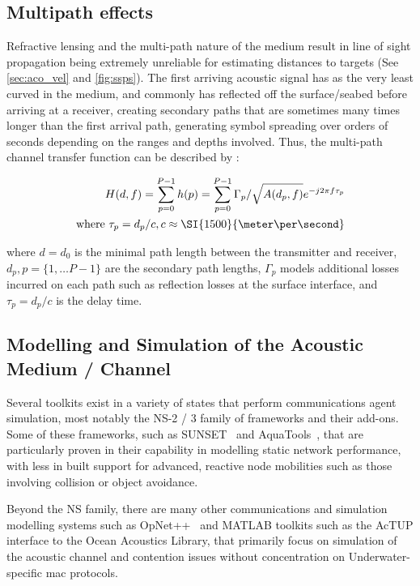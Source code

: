 \subsection{Multipath effects}

Refractive lensing and the multi-path nature of the medium result in line of sight propagation being extremely unreliable for estimating distances to targets (See \autoref{sec:aco_vel} and \autoref{fig:ssps}).
The first arriving acoustic signal has as the very least curved in the medium, and commonly has reflected off the surface/seabed before arriving at a receiver, creating secondary paths that are sometimes many times longer than the first arrival path, generating symbol spreading over orders of seconds depending on the ranges and depths involved.
Thus, the multi-path channel transfer function can be described by :

\begin{align}
  \label{eq:acomultipath}
  H(d,f) =\sum_{p=0}^{P-1} h(p) = \sum_{p=0}^{P-1} \Gamma_p / \sqrt{A(d_p,f)}e^{-j 2 \pi f \tau_p} \\
  \text{where } \tau_p = d_p/c, c \approx \SI{1500}{\meter\per\second} \notag
\end{align}

where $d=d_0$ is the minimal path length between the transmitter and receiver, $d_p,p=\{1,\dots P-1\}$ are the secondary path lengths, $\Gamma_p$ models additional losses incurred on each path such as reflection losses at the surface interface, and $\tau_p = d_p/c$ is the delay time.


\subsection{Modelling and Simulation of the Acoustic Medium / Channel}

Several toolkits exist in a variety of states that perform communications agent simulation, most notably the NS-2 / 3 family of frameworks and their add-ons.
Some of these frameworks, such as SUNSET~\cite{Petrioli2012a} and AquaTools~\cite{Sehgal2010}, that are particularly proven in their capability in modelling static network performance, with less in built support for advanced, reactive node mobilities such as those involving collision or object avoidance.

Beyond the NS family, there are many other communications and simulation modelling systems such as OpNet++~\cite{Chang1999} and MATLAB toolkits such as the AcTUP interface to the Ocean Acoustics Library, that primarily focus on simulation of the acoustic channel and contention issues without concentration on Underwater-specific \gls{mac} protocols.

